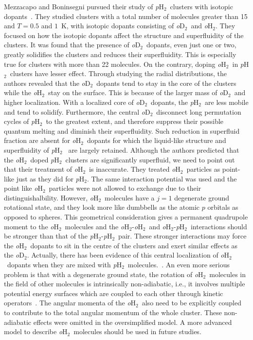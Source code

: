 \documentclass[12pt]{iopart}
\newcommand{\odtwo}{{\em o}D$_2$}
\newcommand{\phtwo}{{\em p}H$_2$}
\newcommand{\ohtwo}{{\em o}H$_2$}
\begin{document}
Mezzacapo and Boninsegni pursued their  study of \phtwo~clusters with isotopic dopants~\cite{mezzacapo_isotope_h2}. 
They studied clusters with a total number of molecules greater than 15 and  $T=0.5$ and $1$~K, with isotopic dopants consisting of \odtwo~and \ohtwo. 
They focused on how the isotopic dopants affect the structure and superfluidity of the clusters. 
It was found that the presence of \odtwo~dopants, even just one or two, greatly solidifies the clusters and reduces their superfluidity. 
This is especially true for clusters with more than 22 molecules. 
On the contrary, doping \ohtwo~in \phtwo~clusters have  lesser effect. 
Through studying the radial distributions, the authors revealed that the \odtwo~dopants tend to stay in the core of the clusters while the \ohtwo~stay on the surface. 
This is because of the larger mass of \odtwo~and higher localization. 
With a localized core of \odtwo~dopants, the \phtwo~are less mobile and tend to solidify. 
Furthermore, the central \odtwo~disconnect long permutation cycles of \phtwo~to the greatest extent, and therefore suppress their possible quantum melting and diminish their superfluidity. 
Such reduction in superfluid fraction are absent for \ohtwo~dopants for which the liquid-like structure and superfluidity of  \phtwo~ are largely retained. 
Although the authors predicted that the \ohtwo~doped \phtwo~clusters are significantly superfluid, 
we need to point out that their treatment of \ohtwo~is inaccurate. 
They treated \ohtwo~particles as point-like just as they did for \phtwo.
The same interaction potential was used and the point like \ohtwo~particles were not allowed to exchange due to their distinguishalbility.
However, \ohtwo~molecules have a $j=1$ degenerate ground rotational state, and they look more like dumbbells as the atomic $p$ orbitals as opposed to  spheres. 
This geometrical consideration gives a permanent quadrupole moment to the \ohtwo~molecules and the \ohtwo-\ohtwo~and \ohtwo-\phtwo~interactions should be stronger than that of the \phtwo-\phtwo~pair. 
These stronger interactions may force the \ohtwo~dopants to sit in the centre of the clusters and exert similar effects as the \odtwo.
Actually, there has been evidence of this central localization of \ohtwo~dopants when they are mixed with \phtwo~molecules.~\cite{akimov_oh2_in_ph2}.
An even more serious problem is that with a degenerate ground state, the rotation of \ohtwo~molecules in the field of other molecules is intrinsically non-adiabatic, i.e., it involves multiple potential energy surfaces which are coupled to each other through kinetic operators~\cite{tully_perspective}. 
The angular momenta of the \ohtwo~also need to be explicitly coupled to contribute to the total angular momentum of the whole cluster. These non-adiabatic effects were omitted in the oversimplified model.  A more advanced model to describe \ohtwo~molecules should be used in future studies.
\end{document}
